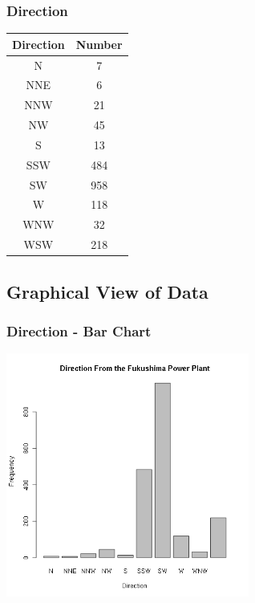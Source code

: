 \begin{frame}
  \frametitle{Direction}

  \begin{tabular}{c|c}
    Direction & Number \\ \hline
    N  & 7 \\
    NNE & 6 \\
    NNW & 21 \\
    NW   & 45 \\
    S  & 13 \\
    SSW  & 484 \\
    SW   & 958 \\
    W & 118 \\
    WNW & 32 \\
    WSW & 218
  \end{tabular}

\end{frame}

\subsection{Graphical View of Data}

\begin{frame}
  \frametitle{Direction - Bar Chart}

  \begin{center}
    \includegraphics[width=8cm]{img/fukushimaDirectionBarPlot}
  \end{center}

\end{frame}

